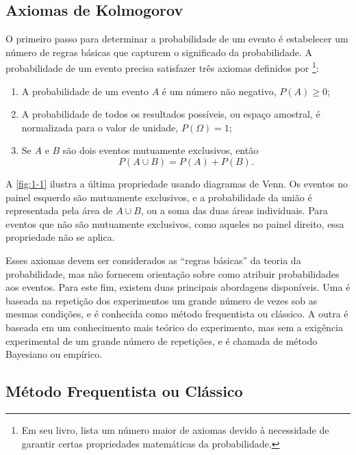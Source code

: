 \subsection{Axiomas de Kolmogorov}

O primeiro passo para determinar a probabilidade de um evento é estabelecer um número de regras básicas que capturem o significado da probabilidade. A probabilidade de um evento precisa satisfazer três axiomas definidos por \citet{kolmogorov1950foundations}\footnote{Em seu livro, \citet{kolmogorov1950foundations} lista um número maior de axiomas devido à necessidade de garantir certas propriedades matemáticas da probabilidade.}:
\begin{enumerate}[noitemsep]
\item A probabilidade de um evento $A$ é um número não negativo, $P(A) \geq 0$;
\item A probabilidade de todos os resultados possíveis, ou espaço amostral, é normalizada para o valor de unidade, $P(\Omega) = 1$;
\item Se $A$ e $B$ são dois eventos mutuamente exclusivos, então
\begin{equation}
P(A \cup B) = P(A) + P(B).
\end{equation}
\end{enumerate}
A \autoref{fig:1-1} ilustra a última propriedade usando diagramas de Venn. Os eventos no painel esquerdo são mutuamente exclusivos, e a probabilidade da união é representada pela área de $A \cup B$, ou a soma das duas áreas individuais. Para eventos que não são mutuamente exclusivos, como aqueles no painel direito, essa propriedade não se aplica.

Esses axiomas devem ser considerados as ``regras básicas'' da teoria da probabilidade, mas não fornecem orientação sobre como atribuir probabilidades aos eventos. Para este fim, existem duas principais abordagens disponíveis. Uma é baseada na repetição dos experimentos um grande número de vezes sob as mesmas condições, e é conhecida como método frequentista ou clássico. A outra é baseada em um conhecimento mais teórico do experimento, mas sem a exigência experimental de um grande número de repetições, e é chamada de método Bayesiano ou empírico.

\subsection{Método Frequentista ou Clássico}

